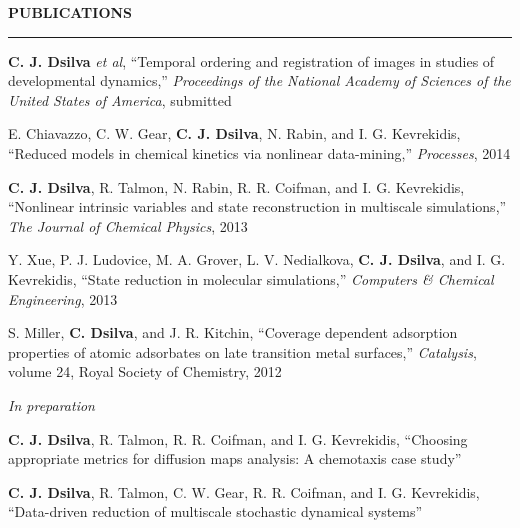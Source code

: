 \documentclass[letterpaper,10pt]{article}
\makeatletter
\newenvironment{itemize*}
  {\begin{itemize}
    \setlength{\parskip}{-3pt}}
  {\end{itemize}}
\newcommand{\cvheading}[1]{
\vspace{0.05in}
\noindent
\MakeUppercase{\bf #1}
\vspace{0.06in}
{\hrule height 0.3mm}
\vspace{0.06in}}
\newcommand{\workplace}[4]{
\noindent
\begin{tabular*}{1.0\textwidth}{@{\extracolsep{\fill}} l r}
{\bf #1} & #2\\
{\em #3} & #4\\
\end{tabular*}
}
\makeatother
\begin{document}



\cvheading{Publications}
\begin{itemize*}
\item {\bf C. J. Dsilva} {\it et al}, ``Temporal ordering and registration of images in studies of developmental dynamics,'' {\em Proceedings of the National Academy of Sciences of the United States of America}, submitted
\item E. Chiavazzo, C. W. Gear, {\bf C. J. Dsilva}, N. Rabin, and I. G. Kevrekidis, ``Reduced models in chemical kinetics via nonlinear data-mining,'' {\em Processes}, 2014
\item {\bf C. J. Dsilva}, R. Talmon, N. Rabin, R. R. Coifman, and I. G. Kevrekidis, ``Nonlinear intrinsic variables and state reconstruction in multiscale simulations,''
{\em The Journal of Chemical Physics}, 2013
\item Y. Xue, P. J. Ludovice, M. A. Grover, L. V. Nedialkova, {\bf C. J. Dsilva}, and I. G. Kevrekidis, ``State reduction in molecular simulations,'' {\em Computers \& Chemical Engineering}, 2013
\item S. Miller, {\bf C. Dsilva}, and J. R. Kitchin, ``Coverage dependent adsorption properties of atomic adsorbates on late transition metal surfaces,'' {\em Catalysis}, volume 24, Royal Society of Chemistry, 2012
\end{itemize*}
%
{\em In preparation}
%
\begin{itemize*}
\item {\bf C. J. Dsilva}, R. Talmon, R. R. Coifman, and I. G. Kevrekidis, ``Choosing appropriate metrics for diffusion maps analysis: A chemotaxis case study''
\item {\bf C. J. Dsilva}, R. Talmon, C. W. Gear, R. R. Coifman, and I. G. Kevrekidis, ``Data-driven reduction of multiscale stochastic dynamical systems''
\end{itemize*}
\end{document}
